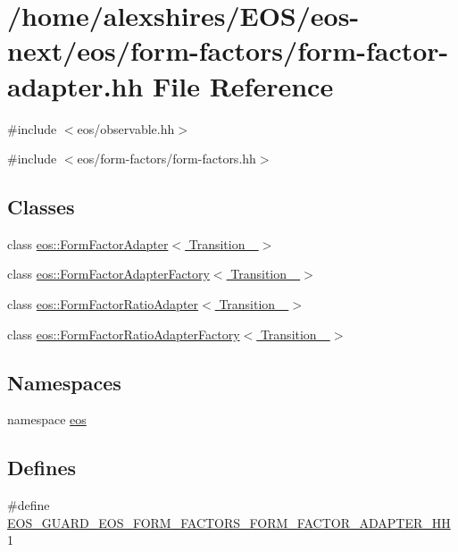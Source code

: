 \hypertarget{form-factor-adapter_8hh}{
\section{/home/alexshires/EOS/eos-\/next/eos/form-\/factors/form-\/factor-\/adapter.hh File Reference}
\label{form-factor-adapter_8hh}
}
{\ttfamily \#include $<$eos/observable.hh$>$}\par
{\ttfamily \#include $<$eos/form-\/factors/form-\/factors.hh$>$}\par
\subsection*{Classes}
\begin{DoxyCompactItemize}
\item 
class \hyperlink{classeos_1_1FormFactorAdapter}{eos::FormFactorAdapter$<$ Transition\_\- $>$}
\item 
class \hyperlink{classeos_1_1FormFactorAdapterFactory}{eos::FormFactorAdapterFactory$<$ Transition\_\- $>$}
\item 
class \hyperlink{classeos_1_1FormFactorRatioAdapter}{eos::FormFactorRatioAdapter$<$ Transition\_\- $>$}
\item 
class \hyperlink{classeos_1_1FormFactorRatioAdapterFactory}{eos::FormFactorRatioAdapterFactory$<$ Transition\_\- $>$}
\end{DoxyCompactItemize}
\subsection*{Namespaces}
\begin{DoxyCompactItemize}
\item 
namespace \hyperlink{namespaceeos}{eos}
\end{DoxyCompactItemize}
\subsection*{Defines}
\begin{DoxyCompactItemize}
\item 
\#define \hyperlink{form-factor-adapter_8hh_ac7572f7449135c1fc3fb2f1c32396cd3}{EOS\_\-GUARD\_\-EOS\_\-FORM\_\-FACTORS\_\-FORM\_\-FACTOR\_\-ADAPTER\_\-HH}~1
\end{DoxyCompactItemize}


